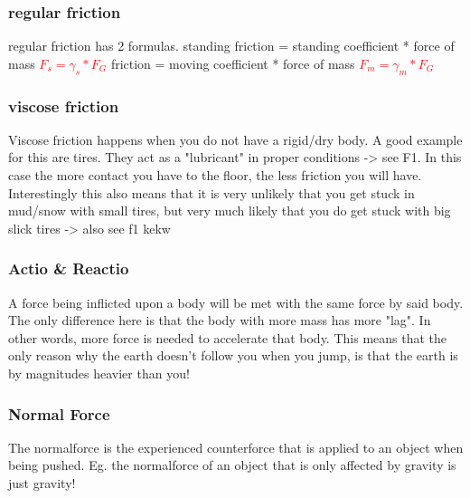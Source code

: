 \documentclass[main.tex,fontsize=8pt,paper=a4,paper=portrait,DIV=calc,]{scrartcl}
\begin{document}
\begin{multicols*}{2}
\subsubsection{regular friction}
regular friction has 2 formulas. \newline
standing friction = standing coefficient * force of mass \newline
\large \textcolor{red}{\(F_{s} = \gamma_s * F_G\)}\newline 
\normalsize friction = moving coefficient * force of mass \newline 
\large\textcolor{red}{\(F_{m} = \gamma_m * F_G\)} \normalsize\newline
{}

\subsubsection{viscose friction}
Viscose friction happens when you do not have a rigid/dry body.\newline
A good example for this are tires. They act as a "lubricant" in proper conditions -> see F1.\newline
In this case the more contact you have to the floor, the less friction you will have.\newline
Interestingly this also means that it is very unlikely that you get stuck in mud/snow with small tires,\newline
but very much likely that you do get stuck with big slick tires -> also see f1 kekw

\subsubsection{Actio \& Reactio}
A force being inflicted upon a body will be met with the same force by said body.\newline
The only difference here is that the body with more mass has more "lag". \newline
In other words, more force is needed to accelerate that body.\newline
This means that the only reason why the earth doesn't follow you when you jump,\newline
is that the earth is by magnitudes heavier than you!\newline
{}

\subsubsection{Normal Force}
The normalforce is the experienced counterforce that is applied to an object when being pushed. Eg. the normalforce of an object that is only affected by gravity is just gravity! 


\end{multicols*}
\end{document}
